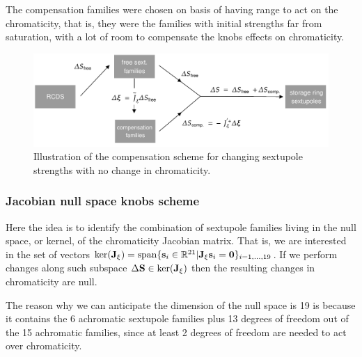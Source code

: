  The compensation families were chosen on basis of having range to act on the chromaticity, that is, they were the families with initial strengths far from saturation, with a lot of room to compensate the knobs effects on chromaticity.
\begin{figure}
    \centering
    \includegraphics[width=\textwidth]{Images/compensation_scheme.pdf}
    \caption[Illustration of the compensation scheme for changing sextupole strengths with no change in chromaticity.]{Illustration of the compensation scheme for changing sextupole strengths with no change in chromaticity.}
    \label{fig:compensation}
\end{figure}
\subsubsection{Jacobian null space knobs scheme}
\label{subsubsec:nullspace}
Here the idea is to identify the combination of sextupole families living in the null space, or kernel, of the chromaticity Jacobian matrix. That is, we are interested in the set of vectors $\text{ker}(\vb{J}_\xi)=\text{span}\{\vb{s}_i\in\mathbb{R}^{21}| \vb{J}_{\xi} \vb{s}_i = \vb{0}\}_{i=1,\dots,19}$. If we perform changes along such subspace $\Delta \vb{S}\in\text{ker}(\vb{J}_\xi)$ then the resulting changes in chromaticity are null.

The reason why we can anticipate the dimension of the null space is 19 is because it contains the 6 achromatic sextupole families plus 13 degrees of freedom out of the 15 achromatic families, since at least 2 degrees of freedom are needed to act over chromaticity.

